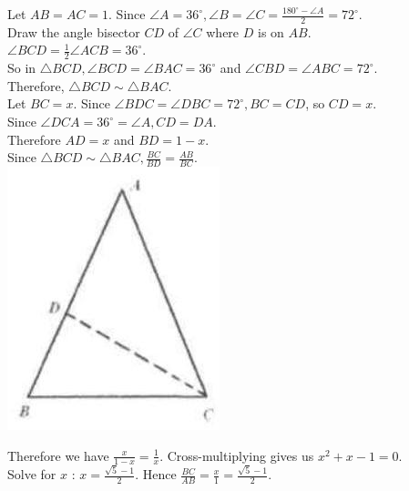 \documentclass{article}
\begin{document}
Let \(A B=A C=1\). Since \(\angle A=36^{\circ}, \angle B=\angle C=\frac{180^{\circ}-\angle A}{2}=72^{\circ}\).\\
Draw the angle bisector \(C D\) of \(\angle C\) where \(D\) is on \(A B\).\\
\(\angle B C D=\frac{1}{2} \angle A C B=36^{\circ}\).\\
So in \(\triangle B C D, \angle B C D=\angle B A C=36^{\circ}\) and \(\angle C B D=\angle A B C=72^{\circ}\).\\
Therefore, \(\triangle B C D \sim \triangle B A C\).\\
Let \(B C=x\). Since \(\angle B D C=\angle D B C=72^{\circ}, B C=C D\), so \(C D=x\).\\
Since \(\angle D C A=36^{\circ}=\angle A, C D=D A\).\\
Therefore \(A D=x\) and \(B D=1-x\).\\
Since \(\triangle B C D \sim \triangle B A C, \frac{B C}{B D}=\frac{A B}{B C}\).\\
\centering
\includegraphics[width=\textwidth]{images/062(1).jpg}

Therefore we have \(\frac{x}{1-x}=\frac{1}{x}\). Cross-multiplying gives us \(x^{2}+x-1=0\).\\
Solve for \(x\) : \(x=\frac{\sqrt{5}-1}{2}\). Hence \(\frac{B C}{A B}=\frac{x}{1}=\frac{\sqrt{5}-1}{2}\).\\
\end{document}
